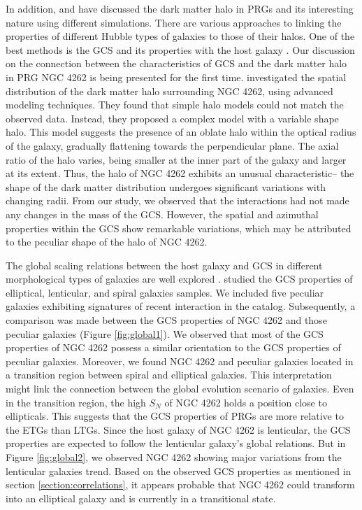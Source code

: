 \documentclass[fleqn,usenatbib]{mnras}
\begin{document}
In addition, \citet{2003Iodice} and \citet{2015Moiseev} have discussed the dark matter halo in PRGs and its interesting nature using different simulations. There are various approaches to linking the properties of different Hubble types of galaxies to those of their halos. One of the best methods is the GCS and its properties with the host galaxy \citep{2017Forbes,2018Hudson,2020Bastian}. Our discussion on the connection between the characteristics of GCS and the dark matter halo in PRG NGC 4262 is being presented for the first time. \citet{2014Khoperskov}  investigated the spatial distribution of the dark matter halo surrounding NGC 4262, using advanced modeling techniques. They found that simple halo models could not match the observed data. Instead, they proposed a complex model with a variable shape halo. This model suggests the presence of an oblate halo within the optical radius of the galaxy, gradually flattening towards the perpendicular plane. The axial ratio of the halo varies, being smaller at the inner part of the galaxy and larger at its extent. Thus, the halo of NGC 4262 exhibits an unusual characteristic-- the shape of the dark matter distribution undergoes significant variations with changing radii. From our study, we observed that the interactions had not made any changes in the mass of the GCS. However, the spatial and azimuthal properties within the GCS show remarkable variations, which may be attributed to the peculiar shape of the halo of NGC 4262.\par


The global scaling relations between the host galaxy and GCS in different morphological types of galaxies are well explored \citep[references therein]{sreeja2014,2015Liu,2013Harris,2021alamokarla,2007Rhode}. \citet{sreeja2014,2016Kartha} studied the GCS properties of elliptical, lenticular, and spiral galaxies samples. We included five peculiar galaxies exhibiting signatures of recent interaction in the catalog. Subsequently, a comparison was made between the GCS properties of NGC 4262 and those peculiar galaxies (Figure \ref{fig:global1}). We observed that most of the GCS properties of NGC 4262 possess a similar orientation to the GCS properties of peculiar galaxies. Moreover, we found NGC 4262 and peculiar galaxies located in a transition region between spiral and elliptical galaxies. This interpretation might link the connection between the global evolution scenario of galaxies. Even in the transition region, the high $S_{N}$ of NGC 4262 holds a position close to ellipticals. This suggests that the GCS properties of PRGs are more relative to the ETGs than LTGs. Since the host galaxy of NGC 4262 is lenticular, the GCS properties are expected to follow the lenticular galaxy's global relations. But in Figure \ref{fig:global2}, we observed NGC 4262 showing major variations from the lenticular galaxies trend. Based on the observed GCS properties as mentioned in section \ref{section:correlations}, it appears probable that NGC 4262 could transform into an elliptical galaxy and is currently in a transitional state.
\end{document}
